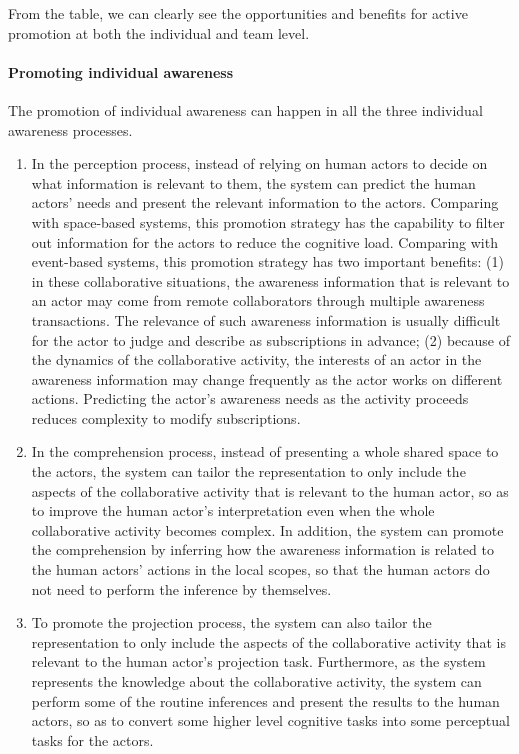 From the table, we can clearly see the opportunities and benefits for active promotion at both the individual and team level.

\paragraph*{Promoting individual awareness} %
\label{par:promoting_individual_awareness}
The promotion of individual awareness can happen in all the three individual awareness processes. 
\begin{enumerate}
   \item In the perception process, instead of relying on human actors to decide on what information is relevant to them, the system can predict the human actors' needs and present the relevant information to the actors. Comparing with space-based systems, this promotion strategy has the capability to filter out information for the actors to reduce the cognitive load. Comparing with event-based systems, this promotion strategy has two important benefits: (1) in these collaborative situations, the awareness information that is relevant to an actor may come from remote collaborators through multiple awareness transactions. The relevance of such awareness information is usually difficult for the actor to judge and describe as subscriptions in advance; (2) because of the dynamics of the collaborative activity, the interests of an actor in the awareness information may change frequently as the actor works on different actions. Predicting the actor's awareness needs as the activity proceeds reduces complexity to modify subscriptions.
   \item In the comprehension process, instead of presenting a whole shared space to the actors, the system can tailor the representation to only include the aspects of the collaborative activity that is relevant to the human actor, so as to improve the human actor's interpretation even when the whole collaborative activity becomes complex. In addition, the system can promote the comprehension by inferring how the awareness information is related to the human actors' actions in the local scopes, so that the human actors do not need to perform the inference by themselves.
   \item To promote the projection process, the system can also tailor the representation to only include the aspects of the collaborative activity that is relevant to the human actor's projection task. Furthermore, as the system represents the knowledge about the collaborative activity, the system can perform some of the routine inferences and present the results to the human actors, so as to convert some higher level cognitive tasks into some perceptual tasks for the actors.
\end{enumerate}

